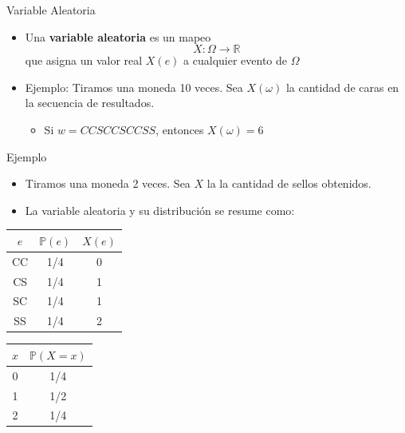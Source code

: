 \documentclass[handout]{beamer}
\begin{document}
\begin{frame}{Variable Aleatoria}
\scriptsize{

\begin{itemize}
 \item Una \textbf{variable aleatoria} es un mapeo 
\begin{displaymath}
 X: \Omega \rightarrow \mathbb{R}
\end{displaymath}
que asigna un valor real $X(e)$ a cualquier evento de $\Omega$


\item Ejemplo: Tiramos una moneda 10 veces. Sea $X(\omega)$ la cantidad de caras en la secuencia de resultados.
\begin{itemize}
 \item Si $w=CCSCCSCCSS$, entonces $X(\omega)=6$ 
\end{itemize}


\end{itemize}

}

\end{frame}

\begin{frame}{Ejemplo}

\begin{itemize}
 \item Tiramos una moneda 2 veces. Sea $X$ la la cantidad de sellos obtenidos.
 \item La variable aleatoria y su distribución se resume como:
\end{itemize}

\begin{table}
\begin{tabular}{c c|c}
\hline
 $e$ & $\mathbb{P}(e)$ & $X(e)$   \\ 
\hline
CC & 1/4 & 0 \\
CS & 1/4 & 1 \\
SC & 1/4 & 1 \\
SS & 1/4 & 2 \\
\hline
\end{tabular}
\end{table}

\begin{table}
\begin{tabular}{c|c}
\hline
 $x$ & $\mathbb{P}(X = x)$   \\ 
\hline
0 & 1/4 \\
1 & 1/2  \\
2 & 1/4  \\
\hline
\end{tabular}
\end{table}

\end{frame}
\end{document}

